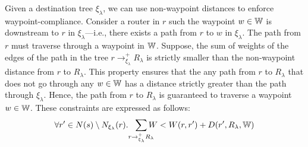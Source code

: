 
Given a destination tree $\xi_\lambda$, we can use
non-waypoint distances to enforce waypoint-compliance. Consider a 
router in $r$ such the waypoint $w \in \mathbb{W}$ is downstream to $r$ in $\xi_\lambda$---i.e.,
there exists a path from $r$ to $w$ in $\xi_\lambda$.
The path from $r$ must traverse through 
a waypoint in $\mathbb{W}$.  
Suppose, the sum of weights of the edges of
the path in the tree $r \rightarrow^+_{\xi_\lambda} R_\lambda$  
is strictly smaller than the non-waypoint 
distance from $r$ to $R_\lambda$. This property ensures that 
the any path from $r$ to $R_\lambda$ that does not go through
any $w \in \mathbb{W}$ has a distance strictly greater than the path through
$\xi_\lambda$.
Hence, the path from $r$ to $R_\lambda$ is guaranteed to traverse
a waypoint $w \in \mathbb{W}$. These constraints are expressed as follows:
\begin{equation} \label{eq:waypoint}
\forall r' \in N(s) \setminus N_{\xi_\lambda}(r).~~ \sum_{\mathclap{\substack{r \rightarrow^+_{\xi_\lambda} R_\lambda}}} 
W < 
W(r, r')+ D(r', R_\lambda, \waypt) 
\end{equation}
